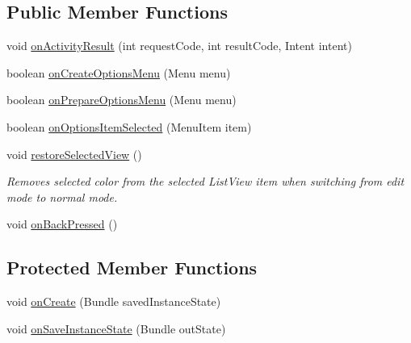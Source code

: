 \subsection*{Public Member Functions}
\begin{DoxyCompactItemize}
\item 
void \hyperlink{classorg_1_1buildmlearn_1_1toolkit_1_1activity_1_1TemplateEditor_a8dd35a4525cae8911df21beed169de02}{on\+Activity\+Result} (int request\+Code, int result\+Code, Intent intent)
\item 
boolean \hyperlink{classorg_1_1buildmlearn_1_1toolkit_1_1activity_1_1TemplateEditor_a9ce2150056a19a2bbd3222f061e1d4b2}{on\+Create\+Options\+Menu} (Menu menu)
\item 
boolean \hyperlink{classorg_1_1buildmlearn_1_1toolkit_1_1activity_1_1TemplateEditor_a4113877eb08f8665000bd3eb733737ef}{on\+Prepare\+Options\+Menu} (Menu menu)
\item 
boolean \hyperlink{classorg_1_1buildmlearn_1_1toolkit_1_1activity_1_1TemplateEditor_a619c591e1af2eba8188da92a021bc222}{on\+Options\+Item\+Selected} (Menu\+Item item)
\item 
void \hyperlink{classorg_1_1buildmlearn_1_1toolkit_1_1activity_1_1TemplateEditor_ae1fb961405f616070237c13e64f5b5bc}{restore\+Selected\+View} ()
\begin{DoxyCompactList}\small\item\em Removes selected color from the selected List\+View item when switching from edit mode to normal mode. \end{DoxyCompactList}\item 
void \hyperlink{classorg_1_1buildmlearn_1_1toolkit_1_1activity_1_1TemplateEditor_a8ebbbe37b4f8ad35d2270678e64dd4b2}{on\+Back\+Pressed} ()
\end{DoxyCompactItemize}
\subsection*{Protected Member Functions}
\begin{DoxyCompactItemize}
\item 
void \hyperlink{classorg_1_1buildmlearn_1_1toolkit_1_1activity_1_1TemplateEditor_abe4f4b6fa4f8ca3bc10f9c01e3b81f73}{on\+Create} (Bundle saved\+Instance\+State)
\item 
void \hyperlink{classorg_1_1buildmlearn_1_1toolkit_1_1activity_1_1TemplateEditor_a6f0e3399d8b62597bfed2bb402d44ae0}{on\+Save\+Instance\+State} (Bundle out\+State)
\end{DoxyCompactItemize}
